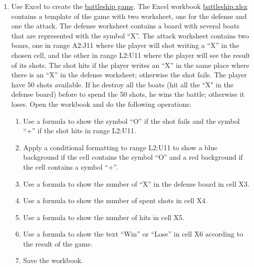 \begin{enumerate}[leftmargin=*,resume]
\item Use Excel to create the \href{https://en.wikipedia.org/wiki/Battleship_(game)}{battleship game}. 
The Excel workbook
\href{http://aprendeconalf.es/office/excel/exercises/formulas/battleship.xlsx}{\textsf{battleship.xlsx}}
contains a template of the game with two worksheet, one for the defense and one the attack. 
The defense worksheet contains a board with several boats that are represented with the symbol ``X''. 
The attack worksheet contains two boars, one in range A2:J11 where the player will shot writing a ``X'' in the chosen
cell, and the other in range L2:U11 where the player will see the result of its shots. 
The shot hits if the player writes an ``X'' in the same place where there is an ``X'' in the defense worksheet;
otherwise the shot fails. 
The player have 50 shots available.
If he destroy all the boats (hit all the ``X" in the defense board) before to spend the 50 shots, he wins the battle;
otherwise it loses. 
Open the workbook and do the following operations:
\begin{enumerate}
\item Use a formula to show the symbol ``O'' if the shot fails and the symbol ``+'' if the shot hits in range L2:U11.
\item Apply a conditional formatting to range L2:U11 to show a blue background if the cell contains the symbol ``O'' and
a red background if the cell contains a symbol ``+''.
\item Use a formula to show the number of ``X'' in the defense board in cell X3. 
\item Use a formula to show the number of spent shots in cell X4.
\item Use a formula to show the number of hits in cell X5.  
\item Use a formula to show the text ``Win'' or ``Lose'' in cell X6 according to the result of the game. 
\item Save the workbook.
\end{enumerate}

\end{enumerate}